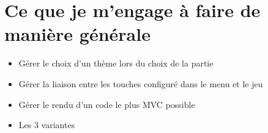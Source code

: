 \documentclass[12pt, openany]{report}
\begin{document}
    \section{Ce que je m'engage à faire de manière générale}
      \begin{itemize}
        \item Gérer le choix d'un thème lors du choix de la partie
        \item Gérer la liaison entre les touches configuré dans le menu et le jeu
        \item Gérer le rendu d'un code le plus MVC possible
        \item Les 3 variantes
      \end{itemize}
\end{document}
